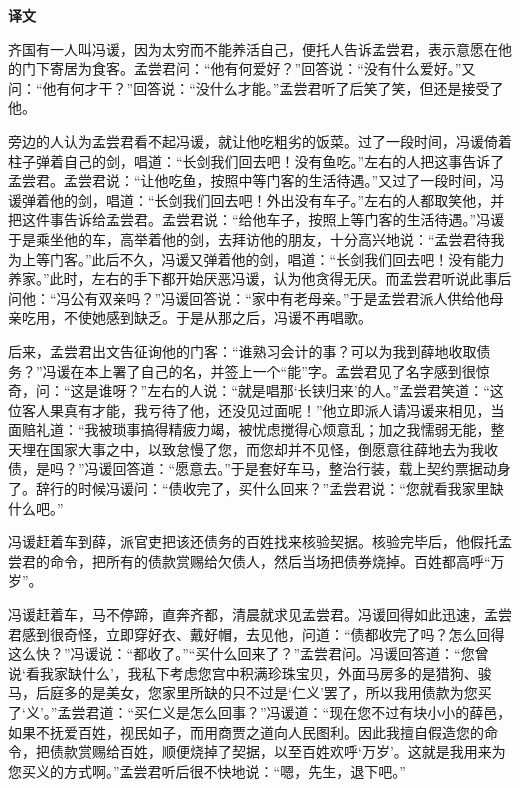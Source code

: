 \documentclass[12pt,UTF-8,openany,a4]{ctexbook}
\begin{document}
\newpage

\begin{Large}
    \noindent\textbf{译文}
\end{Large}


\vspace{1em}

\begin{large}
    \yiwen 
    齐国有一人叫冯谖，因为太穷而不能养活自己，便托人告诉孟尝君，表示意愿在他的门下寄居为食客。孟尝君问：“他有何爱好？”回答说：“没有什么爱好。”又问：“他有何才干？”回答说：“没什么才能。”孟尝君听了后笑了笑，但还是接受了他。
    
    旁边的人认为孟尝君看不起冯谖，就让他吃粗劣的饭菜。过了一段时间，冯谖倚着柱子弹着自己的剑，唱道：“长剑我们回去吧！没有鱼吃。”左右的人把这事告诉了孟尝君。孟尝君说：“让他吃鱼，按照中等门客的生活待遇。”又过了一段时间，冯谖弹着他的剑，唱道：“长剑我们回去吧！外出没有车子。”左右的人都取笑他，并把这件事告诉给孟尝君。孟尝君说：“给他车子，按照上等门客的生活待遇。”冯谖于是乘坐他的车，高举着他的剑，去拜访他的朋友，十分高兴地说：“孟尝君待我为上等门客。”此后不久，冯谖又弹着他的剑，唱道：“长剑我们回去吧！没有能力养家。”此时，左右的手下都开始厌恶冯谖，认为他贪得无厌。而孟尝君听说此事后问他：“冯公有双亲吗？”冯谖回答说：“家中有老母亲。”于是孟尝君派人供给他母亲吃用，不使她感到缺乏。于是从那之后，冯谖不再唱歌。
    
    后来，孟尝君出文告征询他的门客：“谁熟习会计的事？可以为我到薛地收取债务？”冯谖在本上署了自己的名，并签上一个“能”字。孟尝君见了名字感到很惊奇，问：“这是谁呀？”左右的人说：“就是唱那‘长铗归来’的人。”孟尝君笑道：“这位客人果真有才能，我亏待了他，还没见过面呢！”他立即派人请冯谖来相见，当面赔礼道：“我被琐事搞得精疲力竭，被忧虑搅得心烦意乱；加之我懦弱无能，整天埋在国家大事之中，以致怠慢了您，而您却并不见怪，倒愿意往薛地去为我收债，是吗？”冯谖回答道：“愿意去。”于是套好车马，整治行装，载上契约票据动身了。辞行的时候冯谖问：“债收完了，买什么回来？”孟尝君说：“您就看我家里缺什么吧。”
    
    冯谖赶着车到薛，派官吏把该还债务的百姓找来核验契据。核验完毕后，他假托孟尝君的命令，把所有的债款赏赐给欠债人，然后当场把债券烧掉。百姓都高呼“万岁”。
    
    冯谖赶着车，马不停蹄，直奔齐都，清晨就求见孟尝君。冯谖回得如此迅速，孟尝君感到很奇怪，立即穿好衣、戴好帽，去见他，问道：“债都收完了吗？怎么回得这么快？”冯谖说：“都收了。”“买什么回来了？”孟尝君问。冯谖回答道：“您曾说‘看我家缺什么’，我私下考虑您宫中积满珍珠宝贝，外面马房多的是猎狗、骏马，后庭多的是美女，您家里所缺的只不过是‘仁义’罢了，所以我用债款为您买了‘义’。”孟尝君道：“买仁义是怎么回事？”冯谖道：“现在您不过有块小小的薛邑，如果不抚爱百姓，视民如子，而用商贾之道向人民图利。因此我擅自假造您的命令，把债款赏赐给百姓，顺便烧掉了契据，以至百姓欢呼‘万岁’。这就是我用来为您买义的方式啊。”孟尝君听后很不快地说：“嗯，先生，退下吧。”
    

\end{large}
\end{document}
